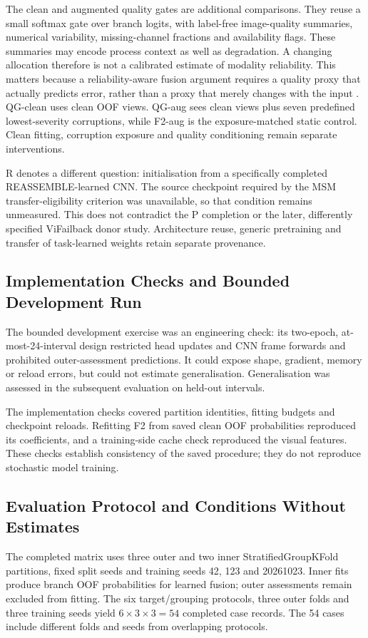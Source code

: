 The clean and augmented quality gates are additional comparisons. They reuse a small
softmax gate over branch logits, with label-free image-quality summaries, numerical
variability, missing-channel fractions and availability flags. These summaries may
encode process context as well as degradation. A changing allocation therefore is not a
calibrated estimate of modality reliability. This matters because a reliability-aware
fusion argument requires a quality proxy that actually predicts error, rather than a
proxy that merely changes with the input \parencite{Zhang2023QMF}. QG-clean uses clean OOF
views. QG-aug sees clean views plus seven predefined lowest-severity corruptions, while
F2-aug is the exposure-matched static control. Clean fitting, corruption exposure and
quality conditioning remain separate interventions.

R denotes a different question: initialisation from a specifically completed
REASSEMBLE-learned CNN. The source checkpoint required by the MSM transfer-eligibility criterion was
unavailable, so that condition remains unmeasured. This does
not contradict the P completion or the later, differently specified ViFailback donor
study. Architecture reuse, generic pretraining and transfer of task-learned weights
retain separate provenance.

\subsection{Implementation Checks and Bounded Development Run}
The bounded development exercise was an engineering check: its two-epoch,
at-most-24-interval design restricted head updates and CNN frame forwards and prohibited
outer-assessment predictions. It could expose shape, gradient, memory or reload errors,
but could not estimate generalisation. Generalisation was assessed in the subsequent
evaluation on held-out intervals.

The implementation checks covered partition identities, fitting budgets and checkpoint
reloads. Refitting F2 from saved clean OOF probabilities reproduced its coefficients,
and a training-side cache check reproduced the visual features. These checks establish
consistency of the saved procedure; they do not reproduce stochastic model training.

\subsection{Evaluation Protocol and Conditions Without Estimates}
The completed matrix uses three outer and two inner StratifiedGroupKFold partitions,
fixed split seeds and training seeds 42, 123 and 20261023. Inner fits produce branch OOF
probabilities for learned fusion; outer assessments remain excluded from fitting. The
six target/grouping protocols, three outer folds and three training seeds yield
$6\times3\times3=54$ completed case records. The 54 cases include
different folds and seeds from overlapping protocols.


